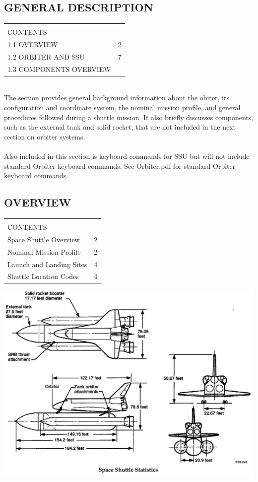 \documentclass[13pt, letter,final]{article}
\begin{document}
\begin{multicols}{2}
\section{\large GENERAL DESCRIPTION}

\begin{tabular}{|p{6.9cm}  p{0.25cm}|}
	\hline
	&\\[0.1cm]
	CONTENTS & \\[0.4cm]
	1.1	OVERVIEW & 2\\
	1.2	ORBITER AND SSU & 7\\
	1.3	COMPONENTS OVERVIEW & \\
	\hline
\end{tabular}
\\[0.4cm]
The section provides general background information about the obiter, its configuration and coordinate system, the nominal mission profile, and general procedures followed during a shuttle mission. It also briefly discusses components, such as the external tank and solid rocket, that are not included in the next section on orbiter systems.\\
\\
Also included in this section is keyboard commands for SSU but will not include standard Orbiter keyboard commands. See Orbiter.pdf for standard Orbiter keyboard commands.
\newpage

\subsection{\large OVERVIEW}

\begin{tabular}{|p{6.9cm} p{0.25cm}|}
	\hline
	&\\[0.1cm]
	CONTENTS & \\[0.4cm]
	Space Shuttle Overview & 2\\
	Nominal Mission Profile & 2\\
	Launch and Landing Sites & 4 \\
	Shuttle Location Codes &  4\\
	\hline
\end{tabular}

\end{multicols}
\includegraphics[width=1\textwidth]{Space Shuttle Stats.jpg}
\end{document}
